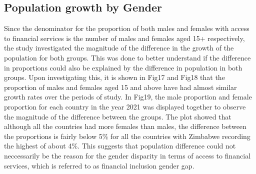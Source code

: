 \documentclass[preprint, 3p,
authoryear]{elsarticle} %
\begin{document}
\hypertarget{population-growth-by-gender}{%
\subsection{Population growth by
Gender}\label{population-growth-by-gender}}

Since the denominator for the proportion of both males and females with
access to financial services is the number of males and females aged 15+
respectively, the study investigated the magnitude of the difference in
the growth of the population for both groups. This was done to better
understand if the difference in proportions could also be explained by
the difference in population in both groups. Upon investigating this, it
is shown in Fig17 and Fig18 that the proportion of males and females
aged 15 and above have had almost similar growth rates over the periods
of study. In Fig19, the male proportion and female proportion for each
country in the year 2021 was displayed together to observe the magnitude
of the difference between the groups. The plot showed that although all
the countries had more females than males, the difference between the
proportions is fairly below 5\% for all the countries with Zimbabwe
recording the highest of about 4\%. This suggests that population
difference could not neccessarily be the reason for the gender disparity
in terms of access to financial services, which is referred to as
financial inclusion gender gap.

\bigskip
\end{document}
